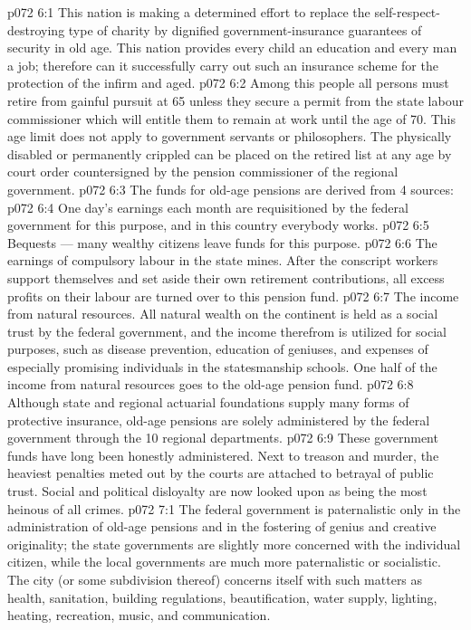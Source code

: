 \vs p072 6:1 This nation is making a determined effort to replace the self\hyp{}respect\hyp{}destroying type of charity by dignified government\hyp{}insurance guarantees of security in old age. This nation provides every child an education and every man a job; therefore can it successfully carry out such an insurance scheme for the protection of the infirm and aged.
\vs p072 6:2 Among this people all persons must retire from gainful pursuit at 65 unless they secure a permit from the state labour commissioner which will entitle them to remain at work until the age of 70. This age limit does not apply to government servants or philosophers. The physically disabled or permanently crippled can be placed on the retired list at any age by court order countersigned by the pension commissioner of the regional government.
\vs p072 6:3 \pc The funds for old\hyp{}age pensions are derived from 4 sources:
\vs p072 6:4 \bibnobreakspace One day’s earnings each month are requisitioned by the federal government for this purpose, and in this country everybody works.
\vs p072 6:5 \bibnobreakspace Bequests --- many wealthy citizens leave funds for this purpose.
\vs p072 6:6 \bibnobreakspace The earnings of compulsory labour in the state mines. After the conscript workers support themselves and set aside their own retirement contributions, all excess profits on their labour are turned over to this pension fund.
\vs p072 6:7 \bibnobreakspace The income from natural resources. All natural wealth on the continent is held as a social trust by the federal government, and the income therefrom is utilized for social purposes, such as disease prevention, education of geniuses, and expenses of especially promising individuals in the statesmanship schools. One half of the income from natural resources goes to the old\hyp{}age pension fund.
\vs p072 6:8 \pc Although state and regional actuarial foundations supply many forms of protective insurance, old\hyp{}age pensions are solely administered by the federal government through the 10 regional departments.
\vs p072 6:9 These government funds have long been honestly administered. Next to treason and murder, the heaviest penalties meted out by the courts are attached to betrayal of public trust. Social and political disloyalty are now looked upon as being the most heinous of all crimes.
\vs p072 7:1 The federal government is paternalistic only in the administration of old\hyp{}age pensions and in the fostering of genius and creative originality; the state governments are slightly more concerned with the individual citizen, while the local governments are much more paternalistic or socialistic. The city (or some subdivision thereof) concerns itself with such matters as health, sanitation, building regulations, beautification, water supply, lighting, heating, recreation, music, and communication.
